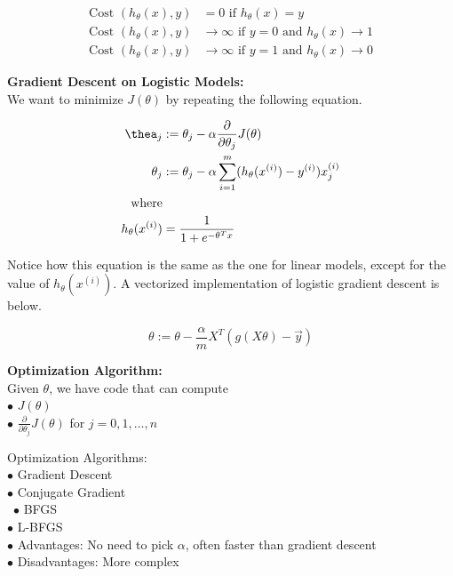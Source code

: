 \begin{align*}
    \text{Cost }(h_{\theta}(x),y)   &= 0 \text{ if } h_{\theta}(x) = y \\
    \text{Cost }(h_{\theta}(x),y)   &\to\infty \text{ if } y=0 \text{ and } h_{\theta}(x)\to 1 \\
    \text{Cost }(h_{\theta}(x),y)   &\to\infty \text{ if } y=1 \text{ and } h_{\theta}(x)\to 0
\end{align*}

\noindent \textbf{Gradient Descent on Logistic Models:} \\

\noindent We want to minimize $J(\theta)$ by repeating the following equation.

\begin{align*}
    \thea_j     &:= \theta_j-\alpha\frac{\partial}{\partial\theta_j}J(\theta) \\
    \theta_j    &:= \theta_j-\alpha\sum^m_{i=1} (h_{\theta}(x^{(i)})-y^{(i)})x_j^{(i)} \\
    \text{where} \\
    h_{\theta}(x^{(i)}) &= \frac{1}{1+e^{-\theta^T x}}
\end{align*}

\noindent Notice how this equation is the same as the one for linear models, except for the value of
$h_{\theta}(x^{(i)})$. A vectorized implementation of logistic gradient descent is below.

\begin{equation*}
    \theta := \theta - \frac{\alpha}{m} X^T (g(X\theta)-\overrightarrow{y})
\end{equation*}

\pagebreak

\noindent \textbf{Optimization Algorithm:} \\
Given $\theta$, we have code that can compute \\
$\bullet$ $J(\theta)$ \\
$\bullet$ $\frac{\partial}{\partial\theta_j}J(\theta)$ for $j=0,1,\dots,n$

\noindent Optimization Algorithms: \\
$\bullet$ Gradient Descent \\
$\bullet$ Conjugate Gradient \\\
$\bullet$ BFGS \\
$\bullet$ L-BFGS \\
$\bullet$ Advantages: No need to pick $\alpha$, often faster than gradient descent \\
$\bullet$ Disadvantages: More complex \\

